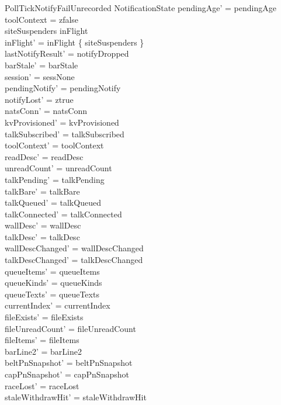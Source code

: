 \documentclass[a4paper,10pt,fleqn]{article}
\begin{document}
\begin{schema}{PollTickNotifyFailUnrecorded}
  \Delta NotificationState
  \where
  pendingAge' = pendingAge \\
  toolContext = zfalse \\
  siteSuspenders \in inFlight \\
  inFlight' = inFlight \setminus \{ siteSuspenders \} \\
  lastNotifyResult' = notifyDropped \\
  barStale' = barStale \\
  session' = sessNone \\
  pendingNotify' = pendingNotify \\
  notifyLost' = ztrue \\
  natsConn' = natsConn \\
  kvProvisioned' = kvProvisioned \\
  talkSubscribed' = talkSubscribed \\
  toolContext' = toolContext \\
  readDesc' = readDesc \\
  unreadCount' = unreadCount \\
  talkPending' = talkPending \\
  talkBare' = talkBare \\
  talkQueued' = talkQueued \\
  talkConnected' = talkConnected \\
  wallDesc' = wallDesc \\
  talkDesc' = talkDesc \\
  wallDescChanged' = wallDescChanged \\
  talkDescChanged' = talkDescChanged \\
  queueItems' = queueItems \\
  queueKinds' = queueKinds \\
  queueTexts' = queueTexts \\
  currentIndex' = currentIndex \\
  fileExists' = fileExists \\
  fileUnreadCount' = fileUnreadCount \\
  fileItems' = fileItems \\
  barLine2' = barLine2 \\
  beltPnSnapshot' = beltPnSnapshot \\
  capPnSnapshot' = capPnSnapshot \\
  raceLost' = raceLost \\
  staleWithdrawHit' = staleWithdrawHit \\

\end{schema}
\end{document}
